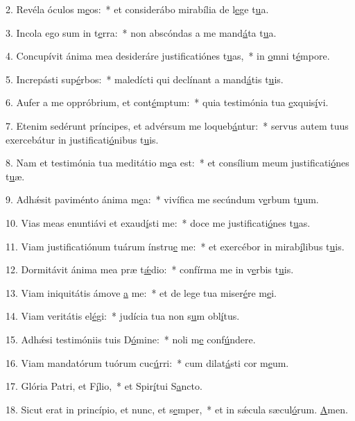 2. Revéla óculos m\uline{e}os:~* et considerábo mirabília de l\uline{e}ge t\uline{u}a.\par 
3. Incola ego sum in t\uline{e}rra:~* non abscóndas a me mand\uline{á}ta t\uline{u}a.\par 
4. Concupívit ánima mea desideráre justificatiónes t\uline{u}as,~* in \uline{o}mni t\uline{é}mpore.\par 
5. Increpásti sup\uline{é}rbos:~* maledícti qui declínant a mand\uline{á}tis t\uline{u}is.\par 
6. Aufer a me oppróbrium, et cont\uline{é}mptum:~* quia testimónia tua \uline{e}xquis\uline{í}vi.\par 
7. Etenim sedérunt príncipes, et advérsum me loqueb\uline{á}ntur:~* servus autem tuus exercebátur in justificati\uline{ó}nibus t\uline{u}is.\par 
8. Nam et testimónia tua meditátio m\uline{e}a est:~* et consílium meum justificati\uline{ó}nes t\uline{u}æ.\par 
9. Adhǽsit paviménto ánima m\uline{e}a:~* vivífica me secúndum v\uline{e}rbum t\uline{u}um.\par 
10. Vias meas enuntiávi et exaud\uline{í}sti me:~* doce me justificati\uline{ó}nes t\uline{u}as.\par 
11. Viam justificatiónum tuárum ínstru\uline{e} me:~* et exercébor in mirab\uline{í}libus t\uline{u}is.\par 
12. Dormitávit ánima mea præ t\uline{ǽ}dio:~* confírma me in v\uline{e}rbis t\uline{u}is.\par 
13. Viam iniquitátis ámove \uline{a} me:~* et de lege tua miser\uline{é}re m\uline{e}i.\par 
14. Viam veritátis el\uline{é}gi:~* judícia tua non s\uline{u}m obl\uline{í}tus.\par 
15. Adhǽsi testimóniis tuis D\uline{ó}mine:~* noli m\uline{e} conf\uline{ú}ndere.\par 
16. Viam mandatórum tuórum cuc\uline{ú}rri:~* cum dilat\uline{á}sti cor m\uline{e}um.\par 
17. Glória Patri, et F\uline{í}lio,~* et Spir\uline{í}tui S\uline{a}ncto.\par 
18. Sicut erat in princípio, et nunc, et s\uline{e}mper,~* et in sǽcula sæcul\uline{ó}rum. \uline{A}men.\par 
